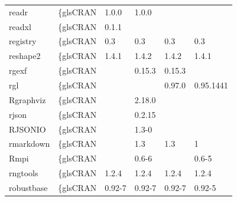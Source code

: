 \begin{longtable}{llllll}
\rowcolor{black!5}
readr                         & \{gls{CRAN}                      & 1.0.0       & 1.0.0       &                &                    \\
\rowcolor{black!10}
readxl                        & \{gls{CRAN}                      & 0.1.1       &             &                &                   \\
\rowcolor{black!5}
registry                      & \{gls{CRAN}                      & 0.3         & 0.3         & 0.3            & 0.3                \\
\rowcolor{black!10}
reshape2                      & \{gls{CRAN}                      & 1.4.1       & 1.4.2       & 1.4.2          & 1.4.1             \\
\rowcolor{black!5}
rgexf                         & \{gls{CRAN}                      &             & 0.15.3      & 0.15.3         &                    \\
\rowcolor{black!10}
rgl                           & \{gls{CRAN}                      &             &             & 0.97.0         & 0.95.1441         \\
\rowcolor{black!5}
Rgraphviz                     & \{gls{CRAN}                      &             & 2.18.0      &                &                    \\
\rowcolor{black!10}
rjson                         & \{gls{CRAN}                      &             & 0.2.15      &                &                   \\
\rowcolor{black!5}
RJSONIO                       & \{gls{CRAN}                      &             & 1.3-0       &                &                    \\
\rowcolor{black!10}
rmarkdown                     & \{gls{CRAN}                      &             & 1.3         & 1.3            & 1                 \\
\rowcolor{black!5}
Rmpi                          & \{gls{CRAN}                      &             & 0.6-6       &                & 0.6-5              \\
\rowcolor{black!10}
rngtools                      & \{gls{CRAN}                      & 1.2.4       & 1.2.4       & 1.2.4          & 1.2.4             \\
\rowcolor{black!5}
robustbase                    & \{gls{CRAN}                      & 0.92-7      & 0.92-7      & 0.92-7         & 0.92-5             \\

\end{longtable}
